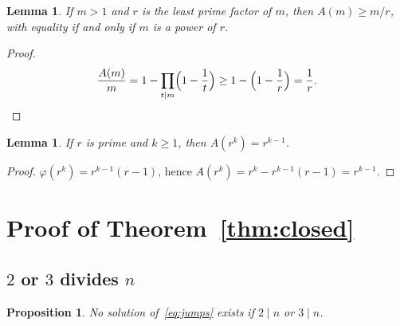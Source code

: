 \documentclass[11pt,reqno]{amsart}
\newcommand{\ph}{\varphi}
\newtheorem{lemma}[theorem]{Lemma}
\newtheorem{proposition}[theorem]{Proposition}
\theoremstyle{definition}
\begin{document}
\begin{lemma}
\label{lem:cot}
If \(m>1\) and \(r\) is the least prime factor of \(m\), then \(A(m)\ge m/r\), with equality if and only if \(m\) is a power of \(r\).
\end{lemma}

\begin{proof}
\[
\frac{A(m)}{m}=1-\prod_{t\mid m}\Bigl(1-\frac{1}{t}\Bigr)\ge 1-\Bigl(1-\frac{1}{r}\Bigr)=\frac{1}{r}.
\]
\end{proof}

\begin{lemma}
\label{lem:Ark}
If \(r\) is prime and \(k\ge 1\), then \(A(r^k)=r^{k-1}\).
\end{lemma}

\begin{proof}
\(\ph(r^k)=r^{k-1}(r-1)\), hence \(A(r^k)=r^k-r^{k-1}(r-1)=r^{k-1}\).
\end{proof}

\section{Proof of Theorem~\ref{thm:closed}}
\label{sec:proof1}

\subsection{\(2\) or \(3\) divides \(n\)}

\begin{proposition}
\label{prop:23}
No solution of~\eqref{eq:jumps} exists if \(2\mid n\) or \(3\mid n\).
\end{proposition}
\end{document}
